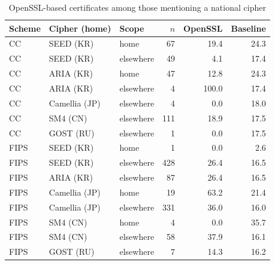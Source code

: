 \begin{table}[htbp]
  \centering
  \caption{OpenSSL-based certificates among those mentioning a national cipher}
  \label{tab:national-ciphers}
  \begin{tabular}{lllrrr}
    \toprule
    Scheme & Cipher (home) & Scope & $n$ & OpenSSL & Baseline \\
    \midrule
    CC   & SEED (KR)       & home      &  67 &  19.4 & 24.3 \\
    CC   & SEED (KR)       & elsewhere &  49 &   4.1 & 17.4 \\
    CC   & ARIA (KR)       & home      &  47 &  12.8 & 24.3 \\
    CC   & ARIA (KR)       & elsewhere &   4 & 100.0 & 17.4 \\
    CC   & Camellia (JP)   & elsewhere &   4 &   0.0 & 18.0 \\
    CC   & SM4 (CN)        & elsewhere & 111 &  18.9 & 17.5 \\
    CC   & GOST (RU)       & elsewhere &   1 &   0.0 & 17.5 \\
    \midrule
    FIPS & SEED (KR)       & home      &   1 &   0.0 &  2.6 \\
    FIPS & SEED (KR)       & elsewhere & 428 &  26.4 & 16.5 \\
    FIPS & ARIA (KR)       & elsewhere &  87 &  26.4 & 16.5 \\
    FIPS & Camellia (JP)   & home      &  19 &  63.2 & 21.4 \\
    FIPS & Camellia (JP)   & elsewhere & 331 &  36.0 & 16.0 \\
    FIPS & SM4 (CN)        & home      &   4 &   0.0 & 35.7 \\
    FIPS & SM4 (CN)        & elsewhere &  58 &  37.9 & 16.1 \\
    FIPS & GOST (RU)       & elsewhere &   7 &  14.3 & 16.2 \\
    \bottomrule
  \end{tabular}
\end{table}
